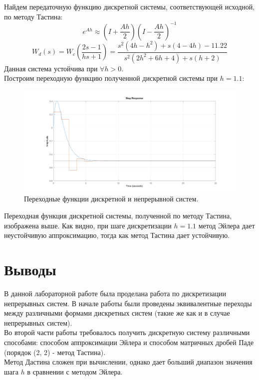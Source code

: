 \documentclass[12pt]{article}
\begin{document}
Найдем передаточную функцию дискретной системы, соответствующей исходной, по методу Тастина:
\[
    e^{Ah} \approx (I + \frac{Ah}{2})(I - \frac{Ah}{2})^{-1}
\]
\[
    W_d(s) = W_c(\frac{2s - 1}{hs + 1}) = \frac{s^2(4h - h^2) + s(4-4h) - 11.22}{s^2(2h^2 + 6h + 4) + s(h + 2)}
\]
Данная система устойчива при $\forall h > 0$.
\ \\
Построим переходную функцию полученной дискретной системы при $h = 1.1$:
\begin{figure}[H]
    \centering
    \includegraphics[width=\textwidth]{3_dustin.png}
    \caption{Переходные функции дискретной и непрерывной систем.}
    \label{fig:3_dustin.png}
\end{figure}

Переходная функция дискретной системы, полученной по методу Тастина, изображена выше. Как видно, при шаге дискретизации $h = 1.1$ метод Эйлера дает неустойчивую аппроксимацию, тогда как метод Тастина дает устойчивую.

\section*{Выводы}
В данной лабораторной работе была проделана работа по дискретизации непрерывных систем. В начале работы были проведены эквивалентные переходы между различными формами дискретных систем (такие же как и в случае непрерывных систем). \\
Во второй части работы требовалось получить дискретную систему различными способами: способом аппроксимации Эйлера и способом матричных дробей Паде (порядок (2, 2) - метод Тастина). \\ 
Метод Дастина сложен при вычислении, однако дает больший диапазон значения шага $h$ в сравнении с методом Эйлера.
\end{document}
